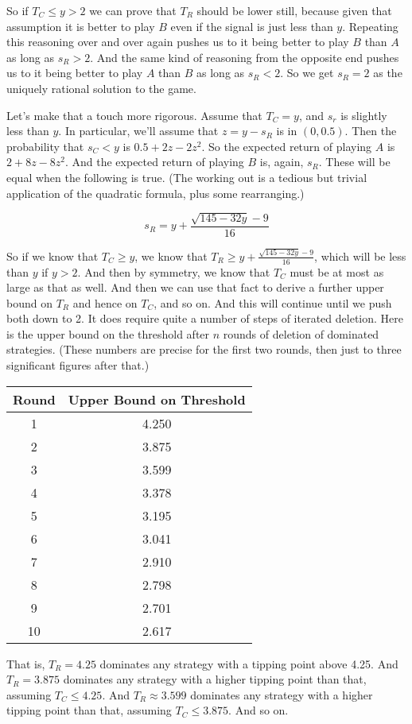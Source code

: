 \documentclass[11pt,]{book}
\def\toprule{}
\def\bottomrule{}
\def\midrule{}
\begin{document}
So if \(T_C \leq y > 2\) we can prove that \(T_R\) should be lower still, because given that assumption it is better to play \(B\) even if the signal is just less than \(y\). Repeating this reasoning over and over again pushes us to it being better to play \(B\) than \(A\) as long as \(s_R > 2\). And the same kind of reasoning from the opposite end pushes us to it being better to play \(A\) than \(B\) as long as \(s_R < 2\). So we get \(s_R = 2\) as the uniquely rational solution to the game.

Let's make that a touch more rigorous. Assume that \(T_C = y\), and \(s_r\) is slightly less than \(y\). In particular, we'll assume that \(z = y - s_R\) is in \((0, 0.5)\). Then the probability that \(s_C < y\) is \(0.5 + 2z - 2z^2\). So the expected return of playing \(A\) is \(2 + 8z - 8z^2\). And the expected return of playing \(B\) is, again, \(s_R\). These will be equal when the following is true. (The working out is a tedious but trivial application of the quadratic formula, plus some rearranging.)

\[s_R = y + \frac{\sqrt{145-32y} - 9}{16}\]

So if we know that \(T_C \geq y\), we know that \(T_R \geq y + \frac{\sqrt{145-32y} - 9}{16}\), which will be less than \(y\) if \(y > 2\). And then by symmetry, we know that \(T_C\) must be at most as large as that as well. And then we can use that fact to derive a further upper bound on \(T_R\) and hence on \(T_C\), and so on. And this will continue until we push both down to 2. It does require quite a number of steps of iterated deletion. Here is the upper bound on the threshold after \(n\) rounds of deletion of dominated strategies. (These numbers are precise for the first two rounds, then just to three significant figures after that.)

\begin{longtable}[]{@{}cc@{}}
\toprule
Round & Upper Bound on Threshold\tabularnewline
\midrule
\endhead
1 & 4.250\tabularnewline
2 & 3.875\tabularnewline
3 & 3.599\tabularnewline
4 & 3.378\tabularnewline
5 & 3.195\tabularnewline
6 & 3.041\tabularnewline
7 & 2.910\tabularnewline
8 & 2.798\tabularnewline
9 & 2.701\tabularnewline
10 & 2.617\tabularnewline
\bottomrule
\end{longtable}

That is, \(T_R = 4.25\) dominates any strategy with a tipping point above 4.25. And \(T_R = 3.875\) dominates any strategy with a higher tipping point than that, assuming \(T_C \leq 4.25\). And \(T_R \approx 3.599\) dominates any strategy with a higher tipping point than that, assuming \(T_C \leq 3.875\). And so on.
\end{document}
